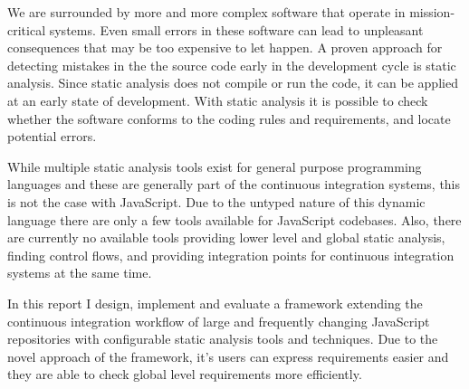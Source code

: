 We are surrounded by more and more complex software that operate in mission-critical systems. Even small errors in these software can lead to unpleasant consequences that may be too expensive to let happen. A proven approach for detecting mistakes in the the source code early in the development cycle is static analysis. Since static analysis does not compile or run the code, it can be applied at an early state of development. With static analysis it is possible to check whether the software conforms to the coding rules and requirements, and locate potential errors.

While multiple static analysis tools exist for general purpose programming languages and these are generally part of the continuous integration systems, this is not the case with JavaScript. Due to the untyped nature of this dynamic language there are only a few tools available for JavaScript codebases. Also, there are currently no available tools providing lower level and global static analysis, finding control flows, and providing integration points for continuous integration systems at the same time.

In this report I design, implement and evaluate a framework extending the continuous integration workflow of large and frequently changing JavaScript repositories with configurable static analysis tools and techniques. Due to the novel approach of the framework, it's users can express requirements easier and they are able to check global level requirements more efficiently.

\clearpage
